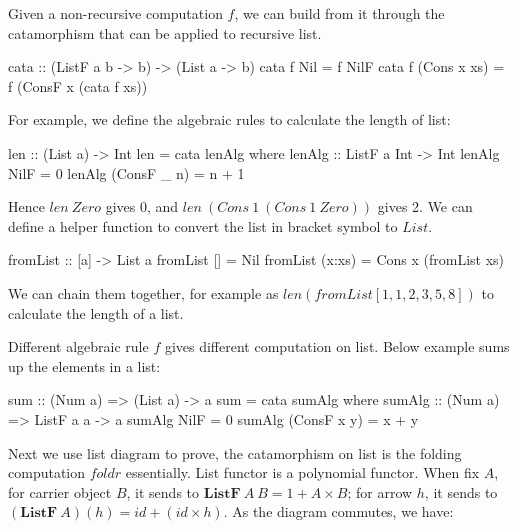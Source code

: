 \documentclass[b5paper]{article}
\begin{document}
\begin{example}
Given a non-recursive computation $f$, we can build from it through the catamorphism that can be applied to recursive list.

\begin{Haskell}
cata :: (ListF a b -> b) -> (List a -> b)
cata f Nil = f NilF
cata f (Cons x xs) = f (ConsF x (cata f xs))
\end{Haskell}

For example, we define the algebraic rules to calculate the length of list:

\begin{Haskell}
len :: (List a) -> Int
len = cata lenAlg where
  lenAlg :: ListF a Int -> Int
  lenAlg NilF = 0
  lenAlg (ConsF _ n) = n + 1
\end{Haskell}

Hence $len\ Zero$ gives 0, and $len\ (Cons\ 1\ (Cons\ 1\ Zero))$ gives 2. We can define a helper function to convert the list in bracket symbol to $List$.

\begin{Haskell}
fromList :: [a] -> List a
fromList [] = Nil
fromList (x:xs) = Cons x (fromList xs)
\end{Haskell}

We can chain them together, for example as $len (fromList [1, 1, 2, 3, 5, 8])$ to calculate the length of a list.

Different algebraic rule $f$ gives different computation on list. Below example sums up the elements in a list:

\begin{Haskell}
sum :: (Num a) => (List a) -> a
sum = cata sumAlg where
  sumAlg :: (Num a) => ListF a a -> a
  sumAlg NilF = 0
  sumAlg (ConsF x y) = x + y
\end{Haskell}

Next we use list diagram to prove, the catamorphism on list is the folding computation $foldr$ essentially. List functor is a polynomial functor. When fix $A$, for carrier object $B$, it sends to $\mathbf{ListF}\ A\ B = 1 + A \times B$; for arrow $h$, it sends to $(\mathbf{ListF}\ A)(h) = id + (id \times h)$. As the diagram commutes, we have:


\end{example}
\end{document}
